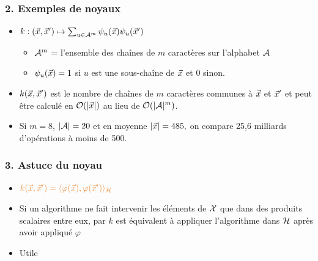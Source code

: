\begin{frame}
  \frametitle{2. Exemples de noyaux}
  \begin{itemize}
  \item {} $k: (\vec{x}, \vec{x}^\prime) \mapsto
    \sum_{u \in \mathcal{A}^m} \psi_u(\vec{x}) \psi_u(\vec{x}^\prime)$
    \begin{itemize}
    \item $\mathcal{A}^m$ = l'ensemble des chaînes de $m$ caractères sur l'alphabet $\mathcal{A}$
    \item $\psi_u(\vec{x}) = 1$ si $u$ est une sous-chaîne de $\vec{x}$ et $0$ sinon.
    \end{itemize}
  \pause
  \item $k(\vec{x}, \vec{x}^\prime)$ est le nombre de chaînes de $m$ caractères
    communes à $\vec{x}$ et $\vec{x}^\prime$ et peut être calculé en
    $\mathcal{O}(|\vec{x}|)$ au lieu de $\mathcal{O}(|\mathcal{A}|^m)$.
    \pause
  \item Si $m=8$, $|\mathcal{A}|=20$ et en moyenne $|\vec{x}| = 485,$ on compare 25,6 milliards
    d'opérations à moins de 500.
  \end{itemize}
\end{frame}

\begin{frame}
  \frametitle{3. Astuce du noyau}
  \begin{itemize}
    \item[]    $\textcolor{MyOrange}{k(\xvec, \xvec^\prime) = \langle \varphi(\xvec), \varphi(\xvec^\prime)\rangle_{\hcal}}$
    \item Si un algorithme ne fait intervenir les éléments de $\mathcal{X}$ que dans
      des produits scalaires entre eux,  par $k$ est
      équivalent à appliquer l'algorithme dans $\mathcal{H}$ après avoir appliqué
      $\varphi$
    \item Utile 
  \end{itemize}
\end{frame}


